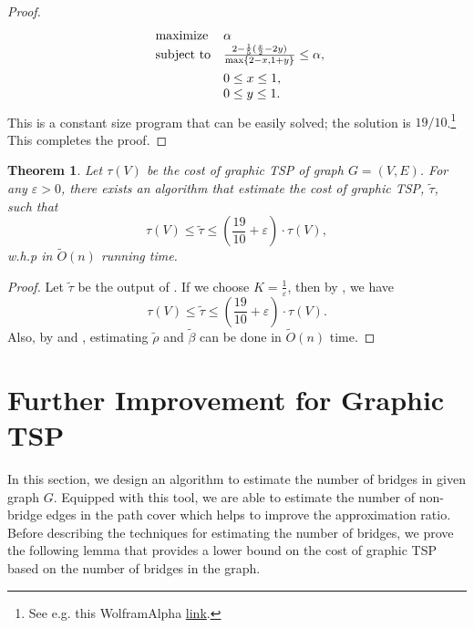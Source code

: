 \documentclass[letterpaper,11pt]{article}
\renewcommand{\epsilon}{\varepsilon}
\newtheorem{theorem}{Theorem}[section]
\newenvironment{myproof}{
\vspace{-0.5cm}
\begin{proof}
}{
\end{proof}
}
\begin{document}
\begin{myproof}
\begin{align*}
\begin{array}{ll@{}ll}
\text{maximize}  & \alpha \\
\vspace{5pt}\text{subject to}& \frac{2 - \frac{1}{5}(\frac{x}{2} - 2y)}{\max\{2-x, 1+y\}} \leq \alpha,\\
                & 0\leq x \leq 1,\\
                 & 0\leq y \leq 1.
\end{array}
\end{align*}
This is a constant size program that can be easily solved; the solution is $19/10$.\footnote{See e.g. this WolframAlpha \href{https://www.wolframalpha.com/input?i=Maximize\%5B\%282-1\%2F5*\%28x\%2F2+-+2y\%29\%29+\%2F+Max\%5B2-x\%2C+1\%2By\%5D\%2C+\%7B0\%3C\%3D+x+\%3C\%3D1\%2C+0\%3C\%3Dy\%3C\%3D1\%7D\%2C+\%7Bx\%2Cy\%7D\%5D}{link}.} This completes the proof.
\end{myproof}



\begin{theorem}\label{thm: graphic-tsp}
Let $\tau(V)$ be the cost of graphic TSP of graph $G = (V, E)$. For any $\epsilon > 0$, there exists an algorithm that estimate the cost of graphic TSP, $\tilde{\tau}$, such that
$$
\tau(V) \leq \tilde{\tau} \leq (\frac{19}{10} + \epsilon) \cdot \tau(V),
$$
w.h.p in $\tilde{O}(n)$ running time.
\end{theorem}
\begin{myproof}
Let $\tilde{\tau}$ be the output of . If we choose $K = \frac{1}{\epsilon}$, then by , we have 
$$
\tau(V) \leq \tilde{\tau} \leq (\frac{19}{10} + \epsilon) \cdot \tau(V).
$$
Also, by  and , estimating $\tilde{\rho}$ and $\tilde{\beta}$ can be done in $\tilde{O}(n)$ time.
\end{myproof}


\section{Further Improvement for Graphic TSP}\label{sec:graphic-TSP-major}
In this section, we design an algorithm to estimate the number of bridges in given graph $G$. Equipped with this tool, we are able to estimate the number of non-bridge edges in the path cover which helps to improve the approximation ratio. Before describing the techniques for estimating the number of bridges, we prove the following lemma that provides a lower bound on the cost of graphic TSP based on the number of bridges in the graph.
\end{document}
